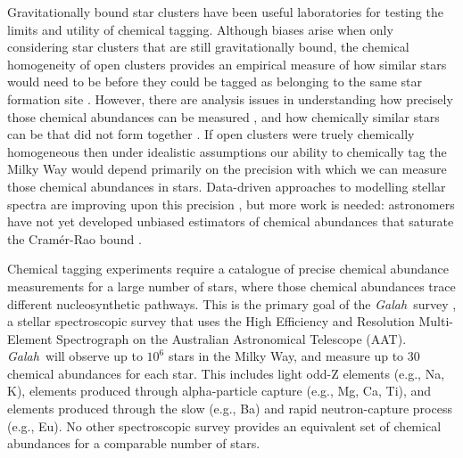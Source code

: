 \documentclass[twocolumn]{aastex62}
\newcommand{\project}[1]{\textsl{#1}}
\newcommand{\Galah}{\project{Galah}}
\begin{document}
Gravitationally bound star clusters have been useful laboratories for
testing the limits and utility of chemical tagging. Although biases arise when
only considering star clusters that are still gravitationally bound, the chemical
homogeneity of open clusters provides an empirical measure of how similar stars
would need to be before they could be tagged as belonging to the same
star formation site \citep{Mitschang:2014}. However, there are analysis
issues in understanding how precisely those chemical abundances can be measured
\citep{Bovy:2016}, and how chemically similar stars can be that did not form 
together \citep[doppleg\"angers;][]{Ness:2018}.
If open clusters were truely chemically homogeneous then under idealistic 
assumptions our ability to chemically tag the Milky Way would depend primarily
on the precision with which we can measure those chemical abundances in stars. 
Data-driven approaches to modelling stellar spectra are
improving upon this precision \citep{Ness:2015,Ness:2018a,Ness:2018b,
Casey:2016,Casey:2017,Ho:2017b,Ho:2017a,Leung;Bovy:2018}, but more work is
needed: astronomers have not yet developed unbiased estimators of chemical
abundances that saturate the Cram\'er-Rao bound \citep{Cramer:1946,Rao:1945}.


Chemical tagging experiments require a catalogue of precise chemical abundance
measurements for a large number of stars,
where those chemical abundances trace different nucleosynthetic pathways.
This is the primary goal of the \Galah\ survey \citep{DeSilva:2015,Martell:2017,Buder:2018},
a stellar spectroscopic survey that uses the High Efficiency and Resolution 
Multi-Element Spectrograph \citep[\project{HERMES};][]{Sheinis:2015} on the Australian 
Astronomical Telescope (AAT).  \Galah\ will observe up to $10^6$ stars in the 
Milky Way, and measure up to 30 chemical abundances for each star. This includes
light odd-Z elements (e.g., Na, K), elements produced through
alpha-particle capture (e.g., Mg, Ca, Ti), and elements produced
through the slow (e.g., Ba) and rapid neutron-capture process
(e.g., Eu). No other spectroscopic survey provides an equivalent set of
chemical abundances for a comparable number of stars.

\end{document}
